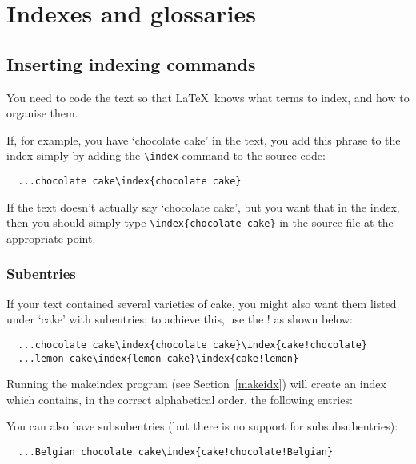 
\chapter{Indexes and glossaries}
\label{indexes}

\section{Inserting indexing commands}
You need to code the text so that \LaTeX\ knows what terms to index, and how
to organise them.

If, for example, you have `chocolate cake' in the text, you add this
phrase to the index simply by adding the \verb"\index" command to the source code:
\begin{verbatim}
  ...chocolate cake\index{chocolate cake}
\end{verbatim}
If the text doesn't actually say `chocolate cake', but you want
that in the index, then you should simply type \verb"\index{chocolate cake}" in the source file
at the appropriate point.

\subsection{Subentries}
If your text contained several varieties of cake, you might
also want them listed under `cake' with subentries; to achieve this, use the ! as shown below:
\begin{verbatim}
  ...chocolate cake\index{chocolate cake}\index{cake!chocolate}
  ...lemon cake\index{lemon cake}\index{cake!lemon}
\end{verbatim}
Running the makeindex program (see Section~\ref{makeidx}) will
create an index which contains, in the correct alphabetical order, the following entries:

\vspace{0.5\baselineskip}%

You can also have subsubentries (but there is no support for subsubsubentries):
\begin{verbatim}
  ...Belgian chocolate cake\index{cake!chocolate!Belgian}
\end{verbatim}

